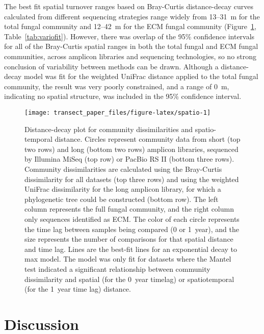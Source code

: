 \documentclass[
  12pt,
]{article}
\begin{document}
The best fit spatial turnover ranges based on Bray-Curtis distance-decay curves calculated from different sequencing strategies range widely from 13--31~m for the total fungal community and 12--42~m for the ECM fungal community (Figure~\ref{fig:spatio}, Table~\ref{tab:variofit}).
However, there was overlap of the 95\% confidence intervals for all of the Bray-Curtis spatial ranges in both the total fungal and ECM fungal communities, across amplicon libraries and sequencing technologies, so no strong conclusion of variability between methods can be drawn.
Although a distance-decay model was fit for the weighted UniFrac distance applied to the total fungal community, the result was very poorly constrained, and a range of 0~m, indicating no spatial structure, was included in the 95\% confidence interval.










\begin{figure}

{\centering \texttt{[image: transect\_paper\_files/figure-latex/spatio-1]} 

}

\caption[Distance-decay plot for community dissimilarities and spatio-temporal distance]{Distance-decay plot for community dissimilarities and spatio-temporal distance. Circles represent community data from short (top two rows) and long (bottom two rows) amplicon libraries, sequenced by Illumina MiSeq (top row) or PacBio RS II (bottom three rows).
Community dissimilarities are calculated using the Bray-Curtis dissimilarity for all datasets (top three rows) and using the weighted UniFrac dissimilarity for the long amplicon library, for which a phylogenetic tree could be constructed (bottom row).
The left column represents the full fungal community, and the right column only sequences identified as ECM.
The color of each circle represents the time lag between samples being compared (0 or 1~year), and the size represents the number of comparisons for that spatial distance and time lag.
Lines are the best-fit lines for an exponential decay to max model.
The model was only fit for datasets where the Mantel test indicated a significant relationship between community dissimilarity and spatial (for the 0~year timelag) or spatiotemporal (for the 1~year time lag) distance.}\label{fig:spatio}
\end{figure}

\hypertarget{discussion}{%
\section{Discussion}\label{discussion}}
\end{document}
